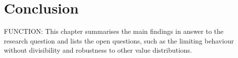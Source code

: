 \chapter{Conclusion}\label{ch:conclusion}

FUNCTION: This chapter summarises the main findings in answer to the research question and lists
the open questions, such as the limiting behaviour without divisibility and robustness to other
value distributions.

